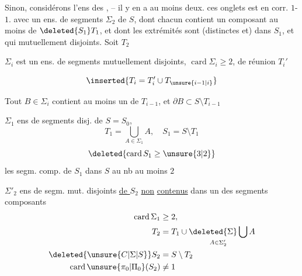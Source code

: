 Sinon, considérons l'ens des ,  -- il y en a au moins deux.  ces onglets est en corr. $1$-$1$. avec un ens. de \unsure{(}segments $\Sigma_2$ de $S$, dont chacun contient un composant au moins de $\deleted{S_1}T_1$, et dont les extrémités sont (distinctes et) dans $S_1$, et qui  mutuellement disjoints. Soit $T_2$


$\Sigma_i$ est un ens. de segments  mutuellement disjoints, $\operatorname{card}\Sigma_i\geq 2$,  de réunion $T_i'$ 

\reversemarginpar{}
\[\inserted{T_i=T_i'\cup T_{\unsure{i-1|i}}}\]
\noindent\llap{\rule[-2\baselineskip]{.4pt}{3\baselineskip}\hspace{.4em}}

Tout $B\in\Sigma_i$ contient au moins un   de $T_{i-1}$, et $\partial B\subset S\setminus T_{i-1}$ \normalmarginpar

\noindent\begin{minipage}[t]{.46\linewidth}
$\Sigma_1$ ens de segments  disj. de $S=S_0$,  
\[T_1=\bigcup_{A\in\Sigma_1} A,\quad S_1=S\setminus T_1\]
\[\deleted{\operatorname{card}S_1\geq\unsure{3|2}}\]
les segm. comp. de $S_1$ dans $S$ au nb au moins $2$
\end{minipage}\hfill\begin{minipage}[t]{.51\linewidth}
$\Sigma'_2$ ens de segm. mut. disjoints \uline{de $S_2$} \uline{non} \uline{contenus} dans un des segments composants
\[\begin{aligned}\operatorname{card}\Sigma_1&\geq 2,\\
T_2&=T_1\cup\mathop{\deleted{\Sigma}\bigcup}\limits_{A\in\Sigma'_2} A\\
\deleted{\unsure{C|\Sigma|S}}S_2&=S\setminus T_2\\
\operatorname{card}\unsure{\pi_0|\Pi_0}(S_2)&\ne 1
\end{aligned}\]
\end{minipage}
